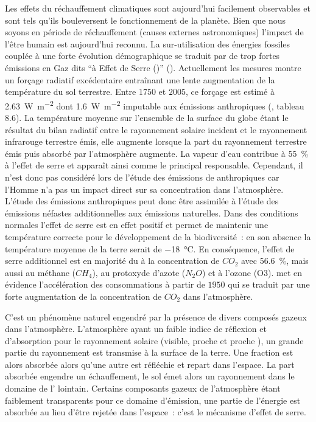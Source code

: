 Les effets du réchauffement climatiques sont aujourd’hui facilement observables et sont
tels qu’ils bouleversent le fonctionnement de la planète. Bien que nous soyons en période
de réchauffement (causes externes astronomiques) l’impact de l’être humain est aujourd’hui
reconnu. La sur-utilisation des énergies fossiles couplée à une forte évolution
démographique se traduit par de trop fortes émissions en Gaz dits \enquote{à Effet de
Serre ()} (). Actuellement les mesures montre un forçage
radiatif excédentaire entraînant une lente augmentation de la température du sol
terrestre. Entre $1750$ et $2005$, ce forçage est estimé à
\SI{2.63}{\watt\per\metre\squared} dont \SI{1.6}{\watt\per\metre\squared} imputable aux
émissions anthropiques (\cite{Myhre2013}, tableau 8.6). La température moyenne sur
l’ensemble de la surface du globe étant le résultat du bilan radiatif entre le rayonnement
solaire incident et le rayonnement infrarouge terrestre émis, elle augmente lorsque la
part du rayonnement terrestre émis puis absorbé par l’atmosphère augmente. La vapeur
d’eau contribue à \SI{55}{\percent} à l’effet de serre et apparaît ainsi comme le
principal responsable. Cependant, il n’est donc pas considéré lors de
l’étude des émissions de
 anthropiques car l’Homme n’a pas un impact direct sur sa concentration dans l’atmosphère.
L’étude des émissions anthropiques peut donc être assimilée à l’étude des émissions
néfastes additionnelles aux émissions naturelles. Dans des conditions normales l’effet de
serre est en effet positif et permet de maintenir une température correcte pour le
développement de la biodiversité~: en son absence la température moyenne de la terre
serait de \SI{-18}{\celsius}. En conséquence, l’effet de serre additionnel est en majorité
du à la concentration de $CO_{2}$ avec \SI{56.6}{\percent}, mais aussi au méthane
($CH_{4}$), au protoxyde d’azote ($N_{2}O$) et à l’ozone (O3).
 met en évidence l’accélération
des consommations à partir de $1950$ qui se traduit par une forte
augmentation de la concentration de $CO_{2}$ dans l’atmosphère.

\begin{Def}\label{def:effet_serre}
C’est un phénomène naturel engendré par la présence de divers composés
gazeux dans l’atmosphère. L’atmosphère ayant un faible indice de réflexion et d’absorption
pour le rayonnement solaire (visible, proche  et proche ), un grande
partie du rayonnement est transmise à la surface de la terre. Une fraction est alors
absorbée alors qu’une autre est réfléchie et repart dans l’espace. La part absorbée
engendre un échauffement, le sol émet alors un rayonnement dans le domaine de l’
lointain. Certains composants gazeux de l’atmosphère étant faiblement transparents pour ce
domaine d’émission, une partie de l’énergie est absorbée au lieu d’être rejetée dans
l’espace~: c’est le mécanisme d’effet de serre.
\end{Def}

